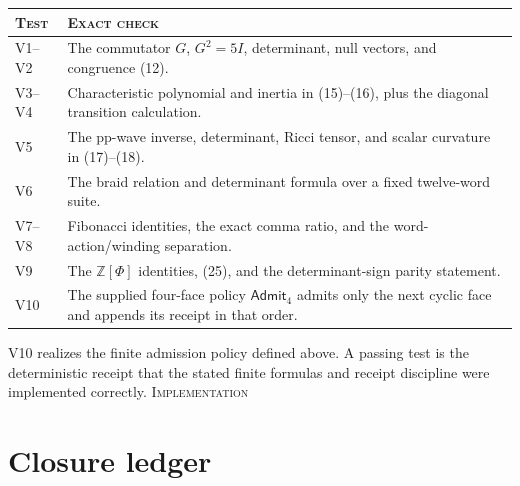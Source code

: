 \documentclass[10pt]{article}
\theoremstyle{remark}
\newcommand{\Admit}{\mathsf{Admit}}
\newcommand{\Z}{\mathbb Z}
\newcommand{\cstatus}[1]{\hfill\textsc{#1}}
\newcommand{\implementation}{\textsc{Implementation}}
\begin{document}
\begin{center}
\begin{tabular}{@{}L{1.2cm}L{10.9cm}@{}}
\toprule
\textsc{Test} & \textsc{Exact check}\\
\midrule
V1--V2 & The commutator $G$, $G^2=5I$, determinant, null vectors, and congruence (12).\\
V3--V4 & Characteristic polynomial and inertia in (15)--(16), plus the diagonal transition calculation.\\
V5 & The pp-wave inverse, determinant, Ricci tensor, and scalar curvature in (17)--(18).\\
V6 & The braid relation and determinant formula over a fixed twelve-word suite.\\
V7--V8 & Fibonacci identities, the exact comma ratio, and the word-action/winding separation.\\
V9 & The $\Z[\Phi]$ identities, (25), and the determinant-sign parity statement.\\
V10 & The supplied four-face policy $\Admit_4$ admits only the next cyclic face and appends its receipt in that order.\\
\bottomrule
\end{tabular}
\end{center}

V10 realizes the finite admission policy defined above.  A passing test is
the deterministic receipt that the stated finite formulas and receipt
discipline were implemented correctly. \cstatus{\implementation}

\section{Closure ledger}
\end{document}
